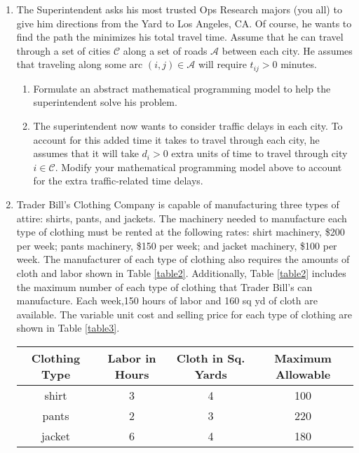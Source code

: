 \documentclass{article}
\begin{document}
\begin{enumerate}
\newpage
\item The Superintendent asks his most trusted Ops Research majors (you all) to give him directions from the Yard to Los Angeles, CA. Of course, he wants to find the path the minimizes his total travel time. Assume that he can travel through a set of cities $\mathcal{C}$ along a set of roads $\mathcal{A}$ between each city. He assumes that traveling along some arc $(i,j) \in \mathcal{A}$ will require $t_{ij} > 0$ minutes.


\begin{enumerate}

\item Formulate an abstract mathematical programming model to help the superintendent solve his problem.


\item The superintendent now wants to consider traffic delays in each city. To account for this added time it takes to travel through each city, he assumes that it will take $d_i > 0$ extra units of time to travel through city $i \in \mathcal{C}$. Modify your mathematical programming model above to account for the extra traffic-related time delays.
\end{enumerate}

\newpage

\item Trader Bill's Clothing Company is capable of manufacturing three types of attire: shirts, pants, and jackets. The machinery needed to manufacture each type of clothing must be rented at the following rates: shirt machinery, \$200 per week; pants machinery, \$150 per week; and jacket machinery, \$100 per week. The manufacturer of each type of clothing also requires the amounts of cloth and labor shown in Table \ref{table2}. Additionally, Table \ref{table2} includes the maximum number of each type of clothing that Trader Bill's can manufacture. Each week,150 hours of labor and 160 sq yd of cloth are available. The variable unit cost and selling price for each type of clothing are shown in Table \ref{table3}.


\begin{center} \label{table2}

\begin{tabular}{ |c|c|c|c| } 
    \hline
    Clothing Type & Labor in Hours & Cloth in Sq. Yards & Maximum Allowable  \\ 
    \hline
    shirt & 3 & 4 & 100\\
    \hline
    pants & 2 & 3 & 220 \\
    \hline
    jacket & 6 & 4 & 180 \\
    \hline
\end{tabular}
\end{center}


\end{enumerate}
\end{document}
